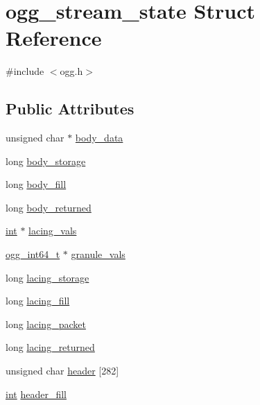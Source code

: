 \hypertarget{structogg__stream__state}{}\section{ogg\+\_\+stream\+\_\+state Struct Reference}
\label{structogg__stream__state}


{\ttfamily \#include $<$ogg.\+h$>$}

\subsection*{Public Attributes}
\begin{DoxyCompactItemize}
\item 
unsigned char $\ast$ \hyperlink{structogg__stream__state_a70d03b6f99c1d1e57f55e800b087dae8}{body\+\_\+data}
\item 
long \hyperlink{structogg__stream__state_acc4cf19d7e31e1a6daab8f76fdb0afd6}{body\+\_\+storage}
\item 
long \hyperlink{structogg__stream__state_a19d45a7b5004f13ae02b5a9502354b93}{body\+\_\+fill}
\item 
long \hyperlink{structogg__stream__state_a602e02c9b0d5653eea5bd4f97bade116}{body\+\_\+returned}
\item 
\hyperlink{xmltok_8h_a5a0d4a5641ce434f1d23533f2b2e6653}{int} $\ast$ \hyperlink{structogg__stream__state_a55f3febfdfa9600b66fa2a990297813e}{lacing\+\_\+vals}
\item 
\hyperlink{config__types_8h_a292432ede703993aa88db876e11b2306}{ogg\+\_\+int64\+\_\+t} $\ast$ \hyperlink{structogg__stream__state_a5ddadad0bd4d5c5381b21da6f11a7d0c}{granule\+\_\+vals}
\item 
long \hyperlink{structogg__stream__state_a23844488216514760bc66b38dfd6d4ae}{lacing\+\_\+storage}
\item 
long \hyperlink{structogg__stream__state_a6090ad58db768aa90218b0bc421d6f0e}{lacing\+\_\+fill}
\item 
long \hyperlink{structogg__stream__state_add3aba822d7f0e2e23c1927a20aaa683}{lacing\+\_\+packet}
\item 
long \hyperlink{structogg__stream__state_a541d66311781b45cf37d87107d515602}{lacing\+\_\+returned}
\item 
unsigned char \hyperlink{structogg__stream__state_aeb8496ef8051c2760c5d57424f30171a}{header} \mbox{[}282\mbox{]}
\item 
\hyperlink{xmltok_8h_a5a0d4a5641ce434f1d23533f2b2e6653}{int} \hyperlink{structogg__stream__state_af37e7ffba5e7197c8bfabee7a1a6b641}{header\+\_\+fill}

\end{DoxyCompactItemize}
